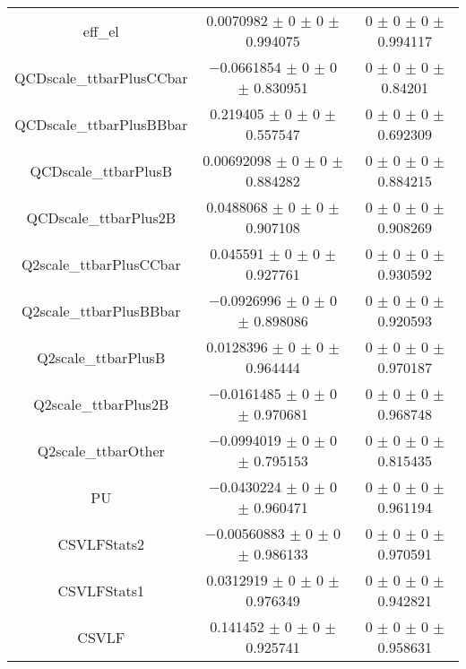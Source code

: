 \begin{table}
\begin{tabular}{ccc}
eff\_el 	& \num{0.0070982} $\pm$ \num{0} $\pm$ \num{0} $\pm$ \num{0.994075} 	& \num{0} $\pm$ \num{0} $\pm$ \num{0} $\pm$ \num{0.994117}\\
QCDscale\_ttbarPlusCCbar 	& \num{-0.0661854} $\pm$ \num{0} $\pm$ \num{0} $\pm$ \num{0.830951} 	& \num{0} $\pm$ \num{0} $\pm$ \num{0} $\pm$ \num{0.84201}\\
QCDscale\_ttbarPlusBBbar 	& \num{0.219405} $\pm$ \num{0} $\pm$ \num{0} $\pm$ \num{0.557547} 	& \num{0} $\pm$ \num{0} $\pm$ \num{0} $\pm$ \num{0.692309}\\
QCDscale\_ttbarPlusB 	& \num{0.00692098} $\pm$ \num{0} $\pm$ \num{0} $\pm$ \num{0.884282} 	& \num{0} $\pm$ \num{0} $\pm$ \num{0} $\pm$ \num{0.884215}\\
QCDscale\_ttbarPlus2B 	& \num{0.0488068} $\pm$ \num{0} $\pm$ \num{0} $\pm$ \num{0.907108} 	& \num{0} $\pm$ \num{0} $\pm$ \num{0} $\pm$ \num{0.908269}\\
Q2scale\_ttbarPlusCCbar 	& \num{0.045591} $\pm$ \num{0} $\pm$ \num{0} $\pm$ \num{0.927761} 	& \num{0} $\pm$ \num{0} $\pm$ \num{0} $\pm$ \num{0.930592}\\
Q2scale\_ttbarPlusBBbar 	& \num{-0.0926996} $\pm$ \num{0} $\pm$ \num{0} $\pm$ \num{0.898086} 	& \num{0} $\pm$ \num{0} $\pm$ \num{0} $\pm$ \num{0.920593}\\
Q2scale\_ttbarPlusB 	& \num{0.0128396} $\pm$ \num{0} $\pm$ \num{0} $\pm$ \num{0.964444} 	& \num{0} $\pm$ \num{0} $\pm$ \num{0} $\pm$ \num{0.970187}\\
Q2scale\_ttbarPlus2B 	& \num{-0.0161485} $\pm$ \num{0} $\pm$ \num{0} $\pm$ \num{0.970681} 	& \num{0} $\pm$ \num{0} $\pm$ \num{0} $\pm$ \num{0.968748}\\
Q2scale\_ttbarOther 	& \num{-0.0994019} $\pm$ \num{0} $\pm$ \num{0} $\pm$ \num{0.795153} 	& \num{0} $\pm$ \num{0} $\pm$ \num{0} $\pm$ \num{0.815435}\\
PU 	& \num{-0.0430224} $\pm$ \num{0} $\pm$ \num{0} $\pm$ \num{0.960471} 	& \num{0} $\pm$ \num{0} $\pm$ \num{0} $\pm$ \num{0.961194}\\
CSVLFStats2 	& \num{-0.00560883} $\pm$ \num{0} $\pm$ \num{0} $\pm$ \num{0.986133} 	& \num{0} $\pm$ \num{0} $\pm$ \num{0} $\pm$ \num{0.970591}\\
CSVLFStats1 	& \num{0.0312919} $\pm$ \num{0} $\pm$ \num{0} $\pm$ \num{0.976349} 	& \num{0} $\pm$ \num{0} $\pm$ \num{0} $\pm$ \num{0.942821}\\
CSVLF 	& \num{0.141452} $\pm$ \num{0} $\pm$ \num{0} $\pm$ \num{0.925741} 	& \num{0} $\pm$ \num{0} $\pm$ \num{0} $\pm$ \num{0.958631}\\

\end{tabular}
\end{table}
